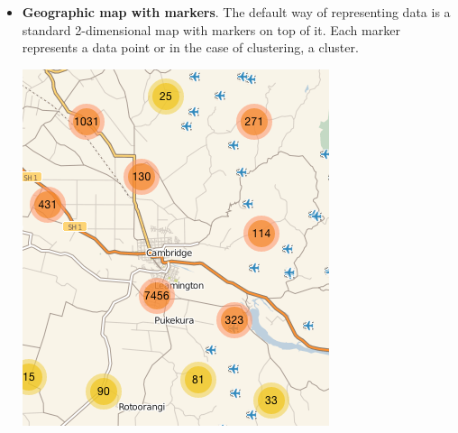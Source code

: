\begin{itemize}

\item \textbf{Geographic map with markers}. The default way of representing data is a standard 2-dimensional map with markers on top of it. Each marker represents a data point or in the case of clustering, a cluster.

\parbox [h]{0.4\textwidth}{
    \includegraphics [width=\linewidth]{figures/map_types_normal_leaflet.png}
    \label{fig:map-type-standard-leaflet}
}
\hfill
\hspace{0.5cm}
\parbox [h]{0.4\textwidth }{
}
\end{itemize}
